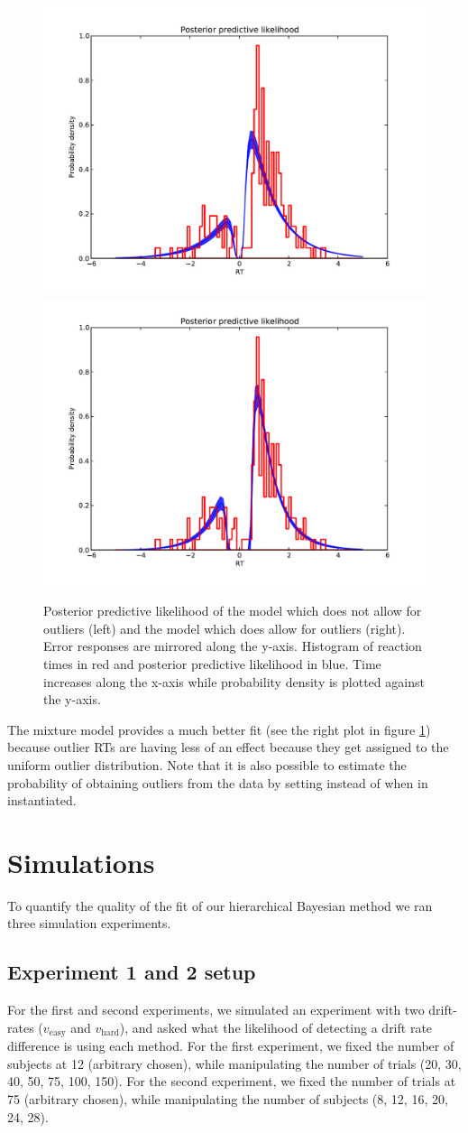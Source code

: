 \documentclass[letterpaper,10pt,english]{article}
\begin{document}
\begin{figure}
\includegraphics[width=0.5\columnwidth]{hddm_demo_fig_10.pdf}
\includegraphics[width=0.5\columnwidth]{hddm_demo_fig_11.pdf}
\caption{Posterior predictive likelihood of the model which does not allow for outliers (left) and the model which does allow for outliers (right). Error responses are mirrored along the y-axis. Histogram of reaction times in red and posterior predictive likelihood in blue. Time increases along the x-axis while probability density is plotted against the y-axis. }
\label{fig.outliers}
\end{figure}


The mixture model provides a much better fit (see the right plot in figure \ref{fig.outliers}) because outlier RTs are having less of an effect because they get assigned to the uniform outlier distribution. Note that it is also possible to estimate the probability of obtaining outliers from the data by setting  instead of  when  in instantiated.

\section*{Simulations}

To quantify the quality of the fit of our hierarchical Bayesian method we ran three simulation experiments.

\subsection*{Experiment 1 and 2 setup}
For the first and second experiments, we simulated an experiment with two drift-rates ($v_{\text{easy}}$ and $v_{\text{hard}}$), and asked what the likelihood of detecting a drift rate difference is using each method. For the first experiment, we fixed the number of subjects at 12 (arbitrary chosen), while manipulating the number of trials (20, 30, 40, 50, 75, 100, 150).  For the second experiment, we fixed the number of trials at 75  (arbitrary chosen), while manipulating the number of subjects (8, 12, 16, 20, 24, 28).
\end{document}
